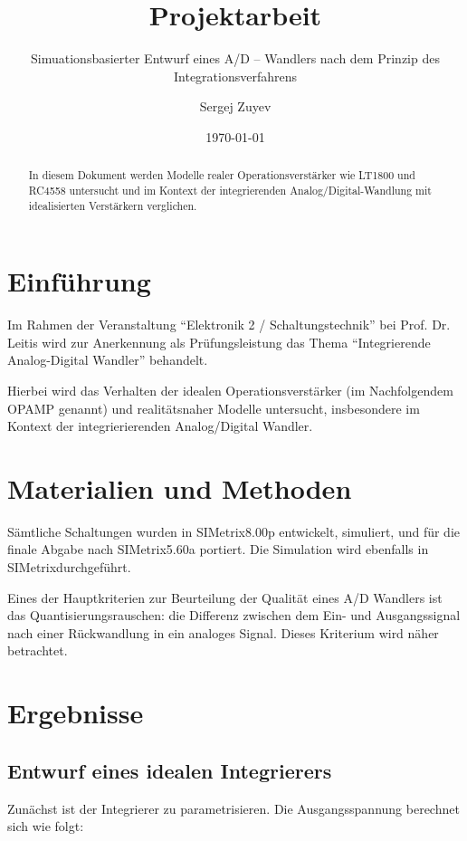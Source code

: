 \documentclass[
	ngerman,
	parskip=half,
	twocolumn,
	DIV=calc,
	]{scrartcl}
\author{Sergej Zuyev}
\title{Projektarbeit}
\subtitle{Simuationsbasierter Entwurf eines A/D – Wandlers nach dem Prinzip des Integrationsverfahrens}
\date{\today}
\begin{document}
	
	\maketitle
	

	\clearpage
	
	\begin{abstract}		
	In diesem Dokument werden Modelle realer Operationsverstärker wie LT1800 und RC4558 untersucht und im Kontext der integrierenden Analog/Digital-Wandlung mit idealisierten Verstärkern verglichen.
	\end{abstract}
	
	\section{Einführung}	
	
		Im Rahmen der Veranstaltung \enquote{Elektronik 2 / Schaltungstechnik} bei Prof. Dr. Leitis wird zur Anerkennung als Prüfungsleistung das Thema \enquote{Integrierende Analog-Digital Wandler} behandelt.
		
		Hierbei wird das Verhalten der idealen Operationsverstärker (im Nachfolgendem OPAMP genannt) und realitätsnaher Modelle untersucht, insbesondere im Kontext der integrierierenden Analog/Digital Wandler.
	
	\section{Materialien und Methoden}
		
		Sämtliche Schaltungen wurden in SIMetrix\texttrademark 8.00p entwickelt,  simuliert, und für die finale Abgabe nach SIMetrix\texttrademark 5.60a portiert.
		Die Simulation wird ebenfalls in SIMetrix\texttrademark durchgeführt. 
		
		Eines der Hauptkriterien zur Beurteilung der Qualität eines A/D Wandlers ist das Quantisierungsrauschen: die Differenz zwischen dem Ein- und Ausgangssignal nach einer Rückwandlung in ein analoges Signal. 
		Dieses Kriterium wird näher betrachtet. 
		 
	\section{Ergebnisse}
		\subsection{Entwurf eines idealen Integrierers}
		\label{sec:ideal_integrator}
		Zunächst ist der Integrierer zu parametrisieren.		
		Die Ausgangsspannung berechnet sich wie folgt:
		
\end{document}
